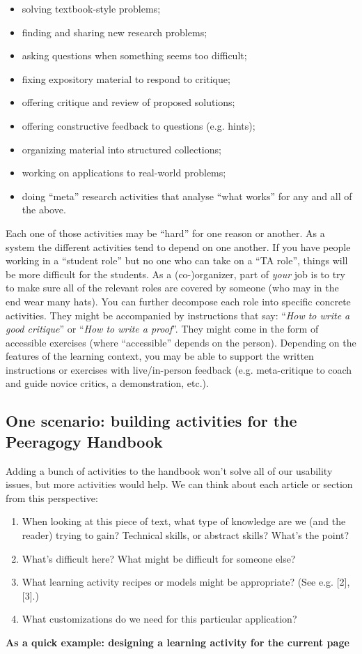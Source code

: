 \begin{itemize}
\item
  solving textbook-style problems;
\item
  finding and sharing new research problems;
\item
  asking questions when something seems too difficult;
\item
  fixing expository material to respond to critique;
\item
  offering critique and review of proposed solutions;
\item
  offering constructive feedback to questions (e.g. hints);
\item
  organizing material into structured collections;
\item
  working on applications to real-world problems;
\item
  doing ``meta'' research activities that analyse ``what works'' for any
  and all of the above.
\end{itemize}
Each one of those activities may be ``hard'' for one reason or another.
As a system the different activities tend to depend on one another. If
you have people working in a ``student role'' but no one who can take on
a ``TA role'', things will be more difficult for the students. As a
(co-)organizer, part of \emph{your} job is to try to make sure all of
the relevant roles are covered by someone (who may in the end wear many
hats). You can further decompose each role into specific concrete
activities. They might be accompanied by instructions that say:
``\emph{How to write a good critique}'' or ``\emph{How to write a proof}''.
They might come in the form of accessible exercises (where ``accessible''
depends on the person). Depending on the features of the learning
context, you may be able to support the written instructions or
exercises with live/in-person feedback (e.g. meta-critique to coach and
guide novice critics, a demonstration, etc.).

\subsection{One scenario: building activities for the Peeragogy
Handbook}

Adding a bunch of activities to the handbook won't solve all of our
usability issues, but more activities would help. We can think about
each article or section from this perspective:

\begin{enumerate}
\item
  When looking at this piece of text, what type of knowledge are we (and
  the reader) trying to gain? Technical skills, or abstract skills?
  What's the point?
\item
  What's difficult here? What might be difficult for someone else?
\item
  What learning activity recipes or models might be appropriate? (See
  e.g. {[}2{]}, {[}3{]}.)
\item
  What customizations do we need for this particular application?
\end{enumerate}
\textbf{\emph{}As a quick example: designing a learning activity for the
current page}

